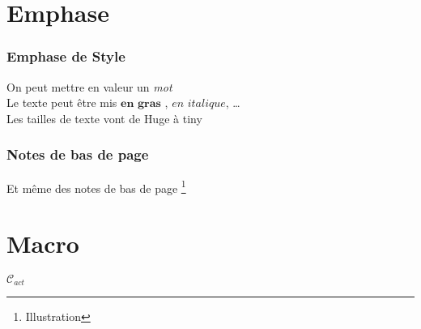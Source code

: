 \documentclass[francais, 10pt]{article}
\begin{document}
\part{Emphase}

	\section{Emphase de Style}
		On peut mettre en valeur un \emph{mot}
		\\
		Le texte peut être mis $\textbf{en gras}$ , $\textit{en italique}$, \dots
		\\
		Les tailles de texte vont de {\Huge Huge} à {\tiny tiny}
	\section{Notes de bas de page}
		Et même des notes de bas de page \footnote{Illustration}

\part{Macro}
	\newcommand{\Cact}{
		\mathcal{C}_{act}
	}
	
	$\Cact$
	
\end{document}
